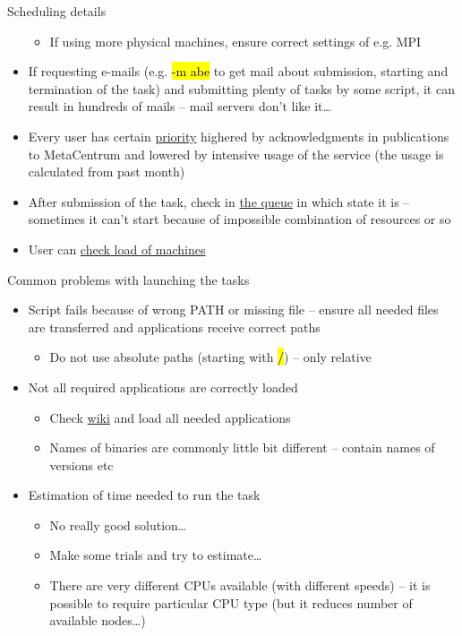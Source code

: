 \documentclass[compress, ucs, xelatex, 11pt, xcolor=svgnames,
  hyperref={
    bookmarks=true,
    unicode=true,
    colorlinks=true,
    pdftitle={Linux, command line and MetaCentrum},
    plainpages=false,
    pdfauthor={Vojtech Zeisek},
    pdfsubject={Course about use of Linux command line, writing shell scripts and using MetaCentrum of CESNET},
    pdfcreator={XeLaTeX},
    pdfkeywords={Linux, GNU, BASH, shell, command line, MetaCentrum},
    linkcolor=DarkRed,
    anchorcolor=DarkBlue,
    citecolor=Indigo,
    filecolor=NavyBlue,
    menucolor=DarkMagenta,
    urlcolor=DarkBlue,
    pdftex},
  url={hyphens, lowtilde} %
  ]{beamer}
\renewcommand{\texttt}[1]{\hl{\ttfamily #1}}
\begin{document}
\begin{frame}[allowframebreaks]{Scheduling details}
\begin{itemize}
\begin{itemize}
      \item If using more physical machines, ensure correct settings of e.g. MPI
    \end{itemize}
    \item If requesting e-mails (e.g. \texttt{-m abe} to get mail about submission, starting and termination of the task) and submitting plenty of tasks by some script, it can result in hundreds of mails -- mail servers don't like it\ldots
    \item Every user has certain \href{https://metavo.metacentrum.cz/pbsmon2/users/}{priority} highered by acknowledgments in publications to MetaCentrum and lowered by intensive usage of the service (the usage is calculated from past month)
    \item After submission of the task, check in \href{https://metavo.metacentrum.cz/pbsmon2/queues/jobsQueued}{the queue} in which state it is -- sometimes it can't start because of impossible combination of resources or so
    \item User can \href{https://metavo.metacentrum.cz/pbsmon2/nodes/physical}{check load of machines}
  \end{itemize}
\end{frame}

\begin{frame}{Common problems with launching the tasks}
  \begin{itemize}
    \item Script fails because of wrong PATH or missing file -- ensure all needed files are transferred and applications receive correct paths
    \begin{itemize}
      \item Do not use absolute paths (starting with \texttt{/}) -- only relative
    \end{itemize}
    \item Not all required applications are correctly loaded
    \begin{itemize}
      \item Check \href{https://wiki.metacentrum.cz/wiki/Kategorie:Applications}{wiki} and load all needed applications
      \item Names of binaries are commonly little bit different -- contain names of versions etc
    \end{itemize}
    \item Estimation of time needed to run the task
    \begin{itemize}
      \item No really good solution\ldots
      \item Make some trials and try to estimate\ldots
      \item There are very different CPUs available (with different speeds) -- it is possible to require particular CPU type (but it reduces number of available nodes\ldots)
    \end{itemize}
  \end{itemize}
\end{frame}
\end{document}
